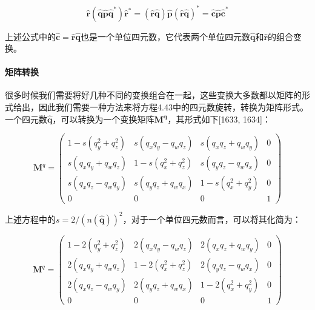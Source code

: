\documentclass[
  paper=a4,
  ,captions=tableheading
]{scrartcl}
\begin{document}
\[
  \hat{\mathbf{r}}\left(\hat{\mathbf{q}} \hat{\mathbf{p}} \hat{\mathbf{q}}^{*}\right) \hat{\mathbf{r}}^{*}=
  (\hat{\mathbf{r}} \hat{\mathbf{q}}) \hat{\mathbf{p}}(\hat{\mathbf{r}} \hat{\mathbf{q}})^{*}
  =
  \hat{\mathbf{c}} \hat{\mathbf{p}} \hat{\mathbf{c}}^{*}
  \tag{4.44}
\]

上述公式中的\(\hat{\mathbf{c}}=\hat{\mathbf{r}} \hat{\mathbf{q}}\)也是一个单位四元数，它代表两个单位四元数\(\mathbf{\hat{q}}\)和\(\mathbf{\hat{r}}\)的组合变换。

\paragraph{矩阵转换}\label{ux77e9ux9635ux8f6cux6362}

很多时候我们需要将好几种不同的变换组合在一起，这些变换大多数都以矩阵的形式给出，因此我们需要一种方法来将方程4.43中的四元数旋转，转换为矩阵形式。一个四元数\(\mathbf{\hat{q}}\)，可以转换为一个变换矩阵\(\mathbf{M^q}\)，其形式如下{[}1633,
1634{]}：

\[
  \mathbf{M}^{q}=\left(\begin{array}{cccc}1-s\left(q_{y}^{2}+q_{z}^{2}\right) & s\left(q_{x} q_{y}-q_{w} q_{z}\right) & s\left(q_{x} q_{z}+q_{w} q_{y}\right) & 0 \\ s\left(q_{x} q_{y}+q_{w} q_{z}\right) & 1-s\left(q_{x}^{2}+q_{z}^{2}\right) & s\left(q_{y} q_{z}-q_{w} q_{x}\right) & 0 \\ s\left(q_{x} q_{z}-q_{w} q_{y}\right) & s\left(q_{y} q_{z}+q_{w} q_{x}\right) & 1-s\left(q_{x}^{2}+q_{y}^{2}\right) & 0 \\ 0 & 0 & 0 & 1\end{array}\right)
  \tag{4.45}
\]

上述方程中的\(s=2 /(n(\hat{\mathbf{q}}))^{2}\)，对于一个单位四元数而言，可以将其化简为：

\[
  \mathbf{M}^{q}=\left(\begin{array}{cccc}1-2\left(q_{y}^{2}+q_{z}^{2}\right) & 2\left(q_{x} q_{y}-q_{w} q_{z}\right) & 2\left(q_{x} q_{z}+q_{w} q_{y}\right) & 0 \\ 2\left(q_{x} q_{y}+q_{w} q_{z}\right) & 1-2\left(q_{x}^{2}+q_{z}^{2}\right) & 2\left(q_{y} q_{z}-q_{w} q_{x}\right) & 0 \\ 2\left(q_{x} q_{z}-q_{w} q_{y}\right) & 2\left(q_{y} q_{z}+q_{w} q_{x}\right) & 1-2\left(q_{x}^{2}+q_{y}^{2}\right) & 0 \\ 0 & 0 & 0 & 1\end{array}\right)
  \tag{4.46}
\]
\end{document}
